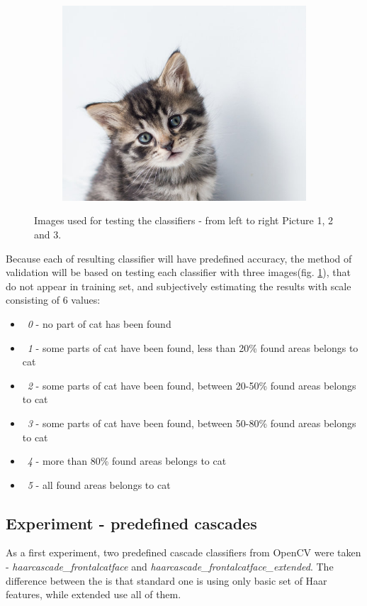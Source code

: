 \documentclass[hyperref]{acmtrans2e}
\begin{document}
\begin{figure}
\begin{subfigure}{.3\textwidth}
\end{subfigure}%
~~
\begin{subfigure}{.3\textwidth}
  \centering
  \includegraphics[width=\linewidth]{lost}
\end{subfigure}
\caption{Images used for testing the classifiers - from left to right Picture 1, 2 and 3.}
\label{fig:test}
\end{figure}
Because each of resulting classifier will have predefined accuracy, the method of validation will be based on testing each classifier with three images(fig. \ref{fig:test}), that do not appear in training set, and subjectively estimating the results with scale consisting of 6 values:
\begin{itemize}
\item ~\emph{0} - no part of cat has been found
\item ~\emph{1} - some parts of cat have been found, less than 20\% found areas belongs to cat
\item ~\emph{2} - some parts of cat have been found, between 20-50\% found areas belongs to cat
\item ~\emph{3} - some parts of cat have been found, between 50-80\% found areas belongs to cat
\item ~\emph{4} - more than 80\% found areas belongs to cat
\item ~\emph{5} - all found areas belongs to cat
\end{itemize}
\subsection{Experiment - predefined cascades}
As a first experiment, two predefined cascade classifiers from OpenCV were taken - \emph{haarcascade\_frontalcatface} and \emph{haarcascade\_frontalcatface\_extended}. The difference between the is that standard one is using only basic set of Haar features, while extended use all of them. 
\end{document}
